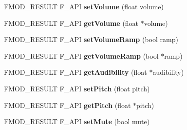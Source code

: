 \begin{DoxyCompactItemize}
\item 
\hypertarget{class_f_m_o_d_1_1_channel_control_a614531fff4b8be9646c9d34c13a6317a}{F\+M\+O\+D\+\_\+\+R\+E\+S\+U\+L\+T F\+\_\+\+A\+P\+I {\bfseries set\+Volume} (float volume)}\label{class_f_m_o_d_1_1_channel_control_a614531fff4b8be9646c9d34c13a6317a}

\item 
\hypertarget{class_f_m_o_d_1_1_channel_control_a5e3d159d6bef6714d585f52b2b98de2e}{F\+M\+O\+D\+\_\+\+R\+E\+S\+U\+L\+T F\+\_\+\+A\+P\+I {\bfseries get\+Volume} (float $\ast$volume)}\label{class_f_m_o_d_1_1_channel_control_a5e3d159d6bef6714d585f52b2b98de2e}

\item 
\hypertarget{class_f_m_o_d_1_1_channel_control_a9b0d1fdd0f1b7e5a36bc52db635937ce}{F\+M\+O\+D\+\_\+\+R\+E\+S\+U\+L\+T F\+\_\+\+A\+P\+I {\bfseries set\+Volume\+Ramp} (bool ramp)}\label{class_f_m_o_d_1_1_channel_control_a9b0d1fdd0f1b7e5a36bc52db635937ce}

\item 
\hypertarget{class_f_m_o_d_1_1_channel_control_af6d6b32fb42a65f5923663bd641a81a0}{F\+M\+O\+D\+\_\+\+R\+E\+S\+U\+L\+T F\+\_\+\+A\+P\+I {\bfseries get\+Volume\+Ramp} (bool $\ast$ramp)}\label{class_f_m_o_d_1_1_channel_control_af6d6b32fb42a65f5923663bd641a81a0}

\item 
\hypertarget{class_f_m_o_d_1_1_channel_control_aec0c20bdc053d3a7108f85eba1e51a84}{F\+M\+O\+D\+\_\+\+R\+E\+S\+U\+L\+T F\+\_\+\+A\+P\+I {\bfseries get\+Audibility} (float $\ast$audibility)}\label{class_f_m_o_d_1_1_channel_control_aec0c20bdc053d3a7108f85eba1e51a84}

\item 
\hypertarget{class_f_m_o_d_1_1_channel_control_a6bf6574915d654bf493cef613cf6bb62}{F\+M\+O\+D\+\_\+\+R\+E\+S\+U\+L\+T F\+\_\+\+A\+P\+I {\bfseries set\+Pitch} (float pitch)}\label{class_f_m_o_d_1_1_channel_control_a6bf6574915d654bf493cef613cf6bb62}

\item 
\hypertarget{class_f_m_o_d_1_1_channel_control_a68ffb4702e11db6929aa8c3eab8d6131}{F\+M\+O\+D\+\_\+\+R\+E\+S\+U\+L\+T F\+\_\+\+A\+P\+I {\bfseries get\+Pitch} (float $\ast$pitch)}\label{class_f_m_o_d_1_1_channel_control_a68ffb4702e11db6929aa8c3eab8d6131}

\item 
\hypertarget{class_f_m_o_d_1_1_channel_control_abb625c998a818410408aa298b80a393c}{F\+M\+O\+D\+\_\+\+R\+E\+S\+U\+L\+T F\+\_\+\+A\+P\+I {\bfseries set\+Mute} (bool mute)}\label{class_f_m_o_d_1_1_channel_control_abb625c998a818410408aa298b80a393c}


\end{DoxyCompactItemize}
